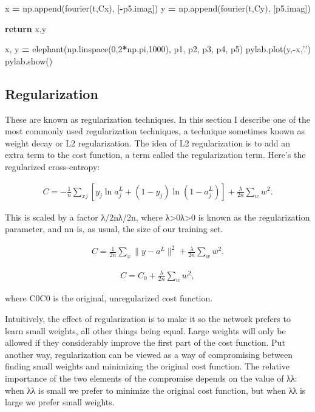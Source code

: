 \documentclass[]{book}
\newenvironment{Shaded}{\begin{snugshade}}{\end{snugshade}}
\newcommand{\DecValTok}[1]{\textcolor[rgb]{0.00,0.00,0.81}{{#1}}}
\newcommand{\StringTok}[1]{\textcolor[rgb]{0.31,0.60,0.02}{{#1}}}
\newcommand{\ControlFlowTok}[1]{\textcolor[rgb]{0.13,0.29,0.53}{\textbf{{#1}}}}
\newcommand{\OperatorTok}[1]{\textcolor[rgb]{0.81,0.36,0.00}{\textbf{{#1}}}}
\newcommand{\NormalTok}[1]{{#1}}
\begin{document}
\begin{Shaded}
\begin{Highlighting}[]
    \NormalTok{x }\OperatorTok{=} \NormalTok{np.append(fourier(t,Cx), [}\OperatorTok{-}\NormalTok{p5.imag])}
    \NormalTok{y }\OperatorTok{=} \NormalTok{np.append(fourier(t,Cy), [p5.imag])}
 
    \ControlFlowTok{return} \NormalTok{x,y}
 
\NormalTok{x, y }\OperatorTok{=} \NormalTok{elephant(np.linspace(}\DecValTok{0}\NormalTok{,}\DecValTok{2}\OperatorTok{*}\NormalTok{np.pi,}\DecValTok{1000}\NormalTok{), p1, p2, p3, p4, p5)}
\NormalTok{pylab.plot(y,}\OperatorTok{-}\NormalTok{x,}\StringTok{'.'}\NormalTok{)}
\NormalTok{pylab.show()}
\end{Highlighting}
\end{Shaded}

\subsection{Regularization}\label{regularization}

These are known as regularization techniques. In this section I describe
one of the most commonly used regularization techniques, a technique
sometimes known as weight decay or L2 regularization. The idea of L2
regularization is to add an extra term to the cost function, a term
called the regularization term. Here's the regularized cross-entropy:

\begin{eqnarray}
C = -\frac{1}{n} \sum_{xj} \left[ y_j \ln a^L_j+(1-y_j) \ln (1-a^L_j)\right] + \frac{\lambda}{2n} \sum_w w^2.
\tag{85}\end{eqnarray}

This is scaled by a factor λ/2nλ/2n, where
λ\textgreater{}0λ\textgreater{}0 is known as the regularization
parameter, and nn is, as usual, the size of our training set.

\begin{eqnarray} C = \frac{1}{2n} \sum_x \|y-a^L\|^2 +
  \frac{\lambda}{2n} \sum_w w^2.
\tag{86}\end{eqnarray}

\begin{eqnarray}  C = C_0 + \frac{\lambda}{2n}
\sum_w w^2,
\tag{87}\end{eqnarray}

where C0C0 is the original, unregularized cost function.

Intuitively, the effect of regularization is to make it so the network
prefers to learn small weights, all other things being equal. Large
weights will only be allowed if they considerably improve the first part
of the cost function. Put another way, regularization can be viewed as a
way of compromising between finding small weights and minimizing the
original cost function. The relative importance of the two elements of
the compromise depends on the value of λλ: when λλ is small we prefer to
minimize the original cost function, but when λλ is large we prefer
small weights.
\end{document}
